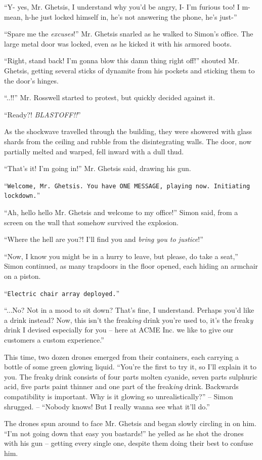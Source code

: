 \documentclass[10pt,a4paper]{article}
\newcommand{\lang}[2]{ #2 \par}
\newcommand{\ai}[2]{
	\lang{
		-- \texttt{#1}
	}{
		``\texttt{#2}''
	}
}
\newcommand{\mainname}{Simon}
\newcommand{\corpname}{ACME Inc.}
\newcommand{\ceoname}{Mr. Rosswell}
\newcommand{\policename}{Mr. Ghetsis}
\begin{document}
\lang{...}{``Y- yes, \policename{}, I understand why you'd be angry, I- I'm furious too! I m-mean, h-he just locked himself in, he's not answering the phone, he's just-''}
\lang{...}{``Spare me the \emph{excuses}!'' \policename{} snarled as he walked to \mainname{}'s office. The large metal door was locked, even as he kicked it with his armored boots.}
\lang{...}{``Right, stand back! I'm gonna blow this damn thing right off!'' shouted \policename{}, getting several sticks of dynamite from his pockets and sticking them to the door's hinges.}
\lang{...}{``..!!'' \ceoname{} started to protest, but quickly decided against it.}
\lang{...}{``Ready?! \emph{BLASTOFF!!}''}
\lang{...}{As the shockwave travelled through the building, they were showered with glass shards from the ceiling and rubble from the disintegrating walls. The door, now partially melted and warped, fell inward with a dull thud.}
\lang{...}{``That's it! I'm going in!'' \policename{} said, drawing his gun.}
\ai{...}{Welcome, \policename{}. You have ONE MESSAGE, playing now. Initiating lockdown.}
\lang{...}{``Ah, hello hello \policename{} and welcome to my office!'' \mainname{} said, from a screen on the wall that somehow survived the explosion.}
\lang{...}{``Where the hell are you?! I'll find you and \emph{bring you to justice}!''}
\lang{...}{``Now, I know you might be in a hurry to leave, but please, do take a seat,'' \mainname{} continued, as many trapdoors in the floor opened, each hiding an armchair on a piston.}
\ai{...}{Electric chair array deployed.}
\lang{...}{``...No? Not in a mood to sit down? That's fine, I understand. Perhaps you'd like a drink instead? Now, this isn't the freak\emph{ing} drink you're used to, it's the freak\emph{y} drink\textsuperscript{\textcopyright} I devised especially for you -- here at \corpname{} we like to give our customers a custom experience.''}
\lang{...}{This time, two dozen drones emerged from their containers, each carrying a bottle of some green glowing liquid. ``You're the first to try it, so I'll explain it to you. The freak\emph{y} drink\textsuperscript{\textcopyright} consists of four parts molten cyanide, seven parts sulphuric acid, five parts paint thinner and one part of the freak\emph{ing} drink. Backwards compatibility is important. Why is it glowing so unrealistically?'' -- \mainname{} shrugged. -- ``Nobody knows! But I really wanna see what it'll do.''}
\lang{...}{The drones spun around to face \policename{} and began slowly circling in on him. ``I'm not going down that easy you bastards!'' he yelled as he shot the drones with his gun -- getting every single one, despite them doing their best to confuse him.}
\end{document}
